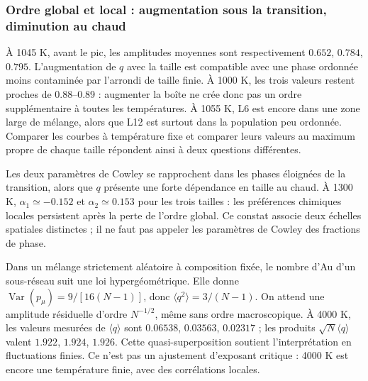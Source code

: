 \subsubsection{Ordre global et local : augmentation sous la transition, diminution au chaud}


À 1045 K, avant le pic, les amplitudes moyennes sont respectivement $0.652$, $0.784$, $0.795$. L’augmentation de $q$ avec la taille est compatible avec une phase ordonnée moins contaminée par l’arrondi de taille finie. À 1000 K, les trois valeurs restent proches de 0.88--0.89 : augmenter la boîte ne crée donc pas un ordre supplémentaire à toutes les températures. À 1055 K, L6 est encore dans une zone large de mélange, alors que L12 est surtout dans la population peu ordonnée. Comparer les courbes à température fixe et comparer leurs valeurs au maximum propre de chaque taille répondent ainsi à deux questions différentes.

Les deux paramètres de Cowley se rapprochent dans les phases éloignées de la transition, alors que $q$ présente une forte dépendance en taille au chaud. À 1300 K, $\alpha_1\simeq-0.152$ et $\alpha_2\simeq0.153$ pour les trois tailles : les préférences chimiques locales persistent après la perte de l’ordre global. Ce constat associe deux échelles spatiales distinctes ; il ne faut pas appeler les paramètres de Cowley des fractions de phase.


Dans un mélange strictement aléatoire à composition fixée, le nombre d’Au d’un sous-réseau suit une loi hypergéométrique. Elle donne $\operatorname{Var}(p_\mu)=9/[16(N-1)]$, donc $\langle q^2\rangle=3/(N-1)$. On attend une amplitude résiduelle d’ordre $N^{-1/2}$, même sans ordre macroscopique. À 4000 K, les valeurs mesurées de $\langle q\rangle$ sont $0.06538$, $0.03563$, $0.02317$ ; les produits $\sqrt N\langle q\rangle$ valent $1.922$, $1.924$, $1.926$. Cette quasi-superposition soutient l’interprétation en fluctuations finies. Ce n’est pas un ajustement d’exposant critique : 4000 K est encore une température finie, avec des corrélations locales.

